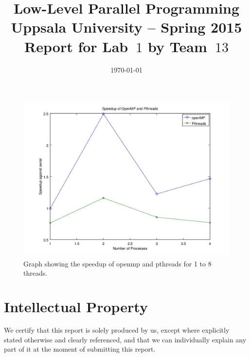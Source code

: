 \documentclass[a4paper,11pt]{article}
\title{\textbf{Low-Level Parallel Programming \\
    Uppsala University -- Spring 2015 \\
    Report for Lab~$1$
    by Team~$13$  %
  }
}
\author{} %
\date{\today}
\begin{document}
\begin{figure}
\includegraphics[width=\textwidth]{graph.jpg}
\caption{Graph showing the speedup of openmp and pthreads for 1 to 8 threads.}
\end{figure}
\section*{Intellectual Property}

We certify that this report is solely produced by us, except where
explicitly stated otherwise and clearly referenced, and that we can
individually explain any part of it at the moment of submitting this
report.
\end{document}
